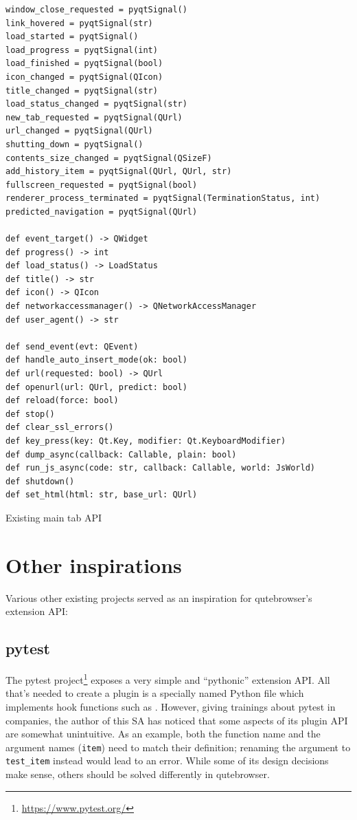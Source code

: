 \begin{listing}
\begin{verbatim}
window_close_requested = pyqtSignal()
link_hovered = pyqtSignal(str)
load_started = pyqtSignal()
load_progress = pyqtSignal(int)
load_finished = pyqtSignal(bool)
icon_changed = pyqtSignal(QIcon)
title_changed = pyqtSignal(str)
load_status_changed = pyqtSignal(str)
new_tab_requested = pyqtSignal(QUrl)
url_changed = pyqtSignal(QUrl)
shutting_down = pyqtSignal()
contents_size_changed = pyqtSignal(QSizeF)
add_history_item = pyqtSignal(QUrl, QUrl, str)
fullscreen_requested = pyqtSignal(bool)
renderer_process_terminated = pyqtSignal(TerminationStatus, int)
predicted_navigation = pyqtSignal(QUrl)

def event_target() -> QWidget
def progress() -> int
def load_status() -> LoadStatus
def title() -> str
def icon() -> QIcon
def networkaccessmanager() -> QNetworkAccessManager
def user_agent() -> str

def send_event(evt: QEvent)
def handle_auto_insert_mode(ok: bool)
def url(requested: bool) -> QUrl
def openurl(url: QUrl, predict: bool)
def reload(force: bool)
def stop()
def clear_ssl_errors()
def key_press(key: Qt.Key, modifier: Qt.KeyboardModifier)
def dump_async(callback: Callable, plain: bool)
def run_js_async(code: str, callback: Callable, world: JsWorld)
def shutdown()
def set_html(html: str, base_url: QUrl)
\end{verbatim}
  \caption{Existing main tab API}
  \label{lst:tabapi}
\end{listing}

\section{Other inspirations}
Various other existing projects served as an inspiration for qutebrowser's
extension API:

\subsection{pytest}

The pytest project\footnote{\url{https://www.pytest.org/}} exposes a very simple
and ``pythonic'' extension API. All that's needed to create a plugin is a
specially named Python file which implements hook functions such as . However, giving trainings about pytest in
companies, the author of this SA has noticed that some aspects of its plugin API
are somewhat unintuitive. As an example, both the function name and the argument
names (\verb|item|) need to match their definition; renaming the argument to
\verb|test_item| instead would lead to an error. While some of its design
decisions make sense, others should be solved differently in qutebrowser.

